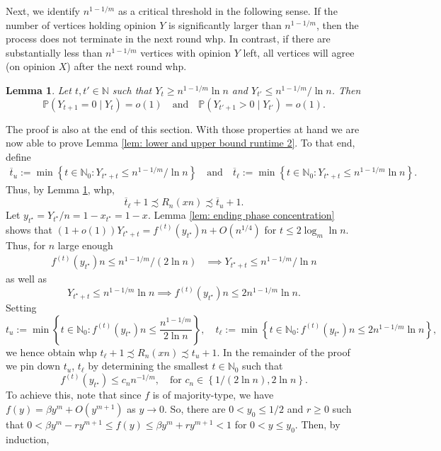 \documentclass[11pt]{article}
\newcommand{\Prob}{\mathbb{P}}
\numberwithin{theorem}{section}
\newtheorem{lemma}[theorem]{Lemma}
\begin{document}
Next, we identify $n^{1-1/m}$ as a critical threshold in the following sense. If the number of vertices holding opinion $Y$ is significantly larger than $n^{1-1/m}$, then the process does not terminate in the next round whp. In contrast, if there are substantially less than $n^{1-1/m}$ vertices with opinion $Y$ left, all vertices will agree (on opinion $X$) after the next round whp.
\begin{lemma}\label{lem: threshold sqrt(n)}
    Let $t, t' \in \mathbb{N}$ such that $Y_t \geq n^{1-1/m}\ln n$ and $Y_{t'} \leq n^{1-1/m}/\ln n$. Then
    \[
    \Prob(Y_{t+1} = 0 \mid Y_t) = o(1)
    \quad 
    \text{and}
    \quad
    \Prob(Y_{t'+1} > 0\mid Y_{t'}) = o(1).
    \]
\end{lemma}
The proof is also at the end of this section. 
With those properties at hand we are now able to prove Lemma \ref{lem: lower and upper bound runtime 2}.
To that end, define
\begin{align*}
    \overline{t}_u := \min \left\{t \in \mathbb{N}_0 : Y_{t^\star +t}\leq n^{1-1/m}/\ln n\right\} 
    \quad
    \text{and}
    \quad
    \overline{t}_\ell := \min \left\{t \in \mathbb{N}_0 : Y_{t^\star+t}\leq n^{1-1/m}\ln n\right\}.
\end{align*}
Thus, by Lemma \ref{lem: threshold sqrt(n)}, whp,
\[
\overline{t}_\ell +1\precsim R_n(xn) \precsim \overline{t}_u +1.
\]
Let $y_{t^\star}=Y_{t^\star}/n = 1-x_{t^\star} = 1-x$. Lemma \ref{lem: ending phase concentration} shows that $(1+o(1))Y_{t^\star+t} = f^{(t)}(y_{t^\star})n + O(n^{1/4})$
for $t\leq 2 \log_m\ln n$.
Thus, for $n$ large enough 
\begin{align*}
    f^{(t)}(y_{t^\star})n \leq n^{1-1/m}/(2\ln n) &\implies Y_{t^\star+t} \leq n^{1-1/m}/\ln n
\end{align*}
as well as
\[
    Y_{t^\star+t} \leq n^{1-1/m} \ln n  \implies f^{(t)}(y_{t^\star})n \leq 2n^{1-1/m} \ln n.
\]
Setting
\[
    t_u := \min \left\{t \in \mathbb{N}_0 : f^{(t)}(y_{t^\star})n\leq \frac{n^{1-1/m}}{2\ln n } \right\},
    \quad
    t_\ell := \min \left\{t \in \mathbb{N}_0 : f^{(t)}(y_{t^\star})n\leq 2n^{1-1/m}\ln n \right\},
\]
we hence obtain whp
    $t_\ell +1\precsim R_n(xn) \precsim t_u +1$.
In the remainder of the proof we pin down $t_u$, $t_\ell$ by determining the smallest $t\in\mathbb{N}_0$ such that
\begin{equation}\label{inequ: End Phases1}
f^{(t)}(y_{t^\star}) \leq c_n n^{-1/m}, \quad \text{for } c_n \in \left\{1/(2\ln n ),2\ln n  \right \}. 
\end{equation}
To achieve this, note that since $f$ is of majority-type, we have $f(y) = \beta y^m +O(y^{m+1})$ as $y \to 0$. So, there are $0< y_0\leq 1/2$ and $r \geq 0$ such that $0<\beta y^m -ry^{m+1} \leq f(y) \leq \beta y^m + r y^{m+1}<1$ for $0< y \leq y_0$. Then, by induction, 
\end{document}
